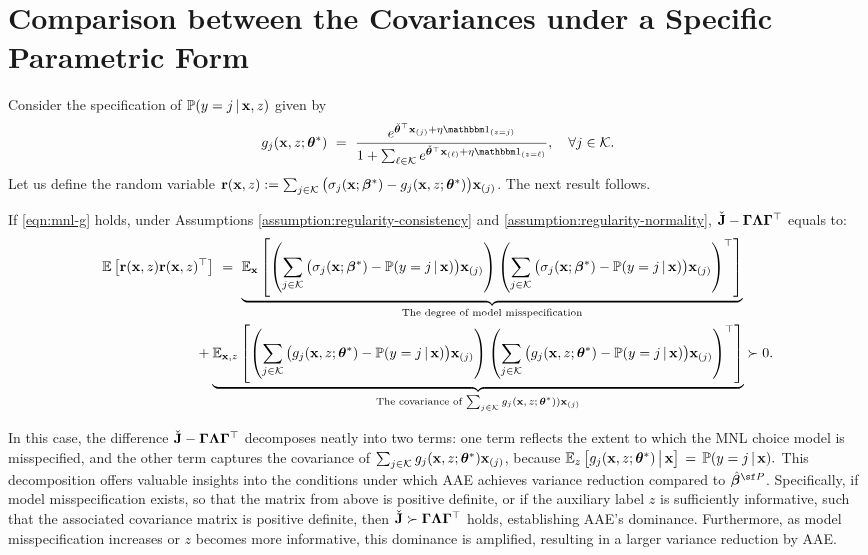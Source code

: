 \section{Comparison between the Covariances under a Specific Parametric Form}
\label{app:comparison}

Consider the specification of $\mathbb{P}(y = j\,|\,\mathbf{x}, z)$ given by 
\begin{align}
    g_j(\x, z; \thetavec^*) ~=~ \frac{e^{\check{\thetavec}^{\top}\x_{(j)}+ \eta\ind_{(z = j)}}}{1+\sum_{\ell \in \Kscr} e^{\check{\thetavec}^{\top}\x_{(\ell)}+ \eta\ind_{(z = \ell)}}}, \quad \forall j \in \Kscr.
    \label{eqn:mnl-g}
\end{align} 
Let us define the random variable
$
\mathbf{r}(\mathbf{x}, z) := \sum_{j\in \mathcal{K}}\big(\sigma_{j}(\mathbf{x}; \bm{\beta}^*) 
 - g_{j}(\mathbf{x}, z; \bm{\theta}^*)\big)\mathbf{x}_{(j)}
$. 
The next result follows. 

\begin{prop}
\label{prop:error-mnl}
    If \eqref{eqn:mnl-g} holds, under Assumptions \ref{assumption:regularity-consistency} and \ref{assumption:regularity-normality},  $\check{\mathbf{J}} -  \bm{\Gamma}\bm{\Lambda}\bm{\Gamma}^{\top}$ equals to:
  \begin{align}
       &\mathbb{E}\left[\mathbf{r}(\mathbf{x}, z)\mathbf{r}(\mathbf{x}, z)^{\top}\right]
        ~=~
     \underbrace{\mathbb{E}_{\mathbf{x}}\left[
      \left(\sum_{j\in \mathcal{K}}\big(\sigma_{j}(\mathbf{x}; \bm{\beta}^*) 
 - \mathbb{P}(y = j\,|\,\mathbf{x})\big)\mathbf{x}_{(j)}
     \right)\left(\sum_{j\in \mathcal{K}}\big(\sigma_{j}(\mathbf{x}; \bm{\beta}^*) 
 - \mathbb{P}(y = j\,|\,\mathbf{x})\big)\mathbf{x}_{(j)}
     \right)^{\top}
     \right]}_{\text{\upshape{The degree of model misspecification}}}\notag\\
     &~~~~~~~~~~~~~~~~~~~~+\underbrace{\mathbb{E}_{\mathbf{x},z}\left[
      \left(\sum_{j\in \mathcal{K}}\big(g_{j}(\mathbf{x}, z; \bm{\theta}^*)
 - \mathbb{P}(y = j\,|\,\mathbf{x})\big)\mathbf{x}_{(j)}
     \right)\left(\sum_{j\in \mathcal{K}}\big(g_{j}(\mathbf{x}, z; \bm{\theta}^*)
 - \mathbb{P}(y = j\,|\,\mathbf{x})\big)\mathbf{x}_{(j)}
     \right)^{\top}
     \right]}_{\text{\upshape{The covariance of $\sum_{j\in \mathcal{K}}g_{j}(\mathbf{x}, z; \bm{\theta}^*))\mathbf{x}_{(j)}$}}}\succ 0.
     \label{eqn:decomposition-variance}
  \end{align}
\end{prop}

In this case, the difference $ \check{\mathbf{J}} - \bm{\Gamma}\bm{\Lambda}\bm{\Gamma}^{\top} $ decomposes neatly into two terms: one term reflects the extent to which the MNL choice model is misspecified, and the other term captures the covariance of $ \sum_{j \in \mathcal{K}} g_{j}(\mathbf{x}, z; \bm{\theta}^*) \mathbf{x}_{(j)} $,
because  
$
\mathbb{E}_{z}\left[
g_{j}(\mathbf{x}, z; \bm{\theta}^*) \,\big|\,\mathbf{x}
\right]\,=\,\mathbb{P}(y = j\,|\,\mathbf{x}).
$
This decomposition offers valuable insights into the conditions under which AAE achieves variance reduction compared to $ \hat{\betavec}^{\sf P}$. 
Specifically, if model misspecification exists, so that the matrix from above is positive definite, or if the auxiliary label $ z $ is sufficiently informative, such that the associated covariance matrix is positive definite, then $\check{\mathbf{J}} \succ \bm{\Gamma}\bm{\Lambda}\bm{\Gamma}^{\top}$ holds, establishing AAE’s dominance. 
Furthermore, as model misspecification increases or $ z $ becomes more informative, this dominance is amplified, resulting in a larger variance reduction by AAE.

